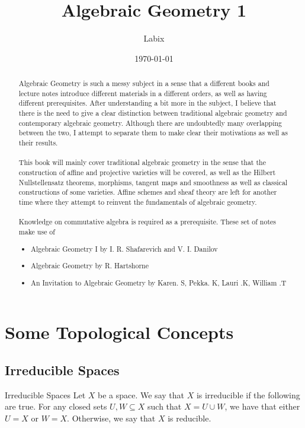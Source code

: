\documentclass[a4paper]{article}
\title{Algebraic Geometry 1}
\author{Labix}
\date{\today}
\begin{document}
\maketitle
\begin{abstract}
Algebraic Geometry is such a messy subject in a sense that a different books and lecture notes introduce different materials in a different orders, as well as having different prerequisites. After understanding a bit more in the subject, I believe that there is the need to give a clear distinction between traditional algebraic geometry and contemporary algebraic geometry. Although there are undoubtedly many overlapping between the two, I attempt to separate them to make clear their motivations as well as their results. \\~\\

This book will mainly cover traditional algebraic geometry in the sense that the construction of affine and projective varieties will be covered, as well as the Hilbert Nullstellensatz theorems, morphisms, tangent maps and smoothness as well as classical constructions of some varieties. Affine schemes and sheaf theory are left for another time where they attempt to reinvent the fundamentals of algebraic geometry. \\~\\

Knowledge on commutative algebra is required as a prerequisite. These set of notes make use of
\begin{itemize}
\item Algebraic Geometry I by I. R. Shafarevich and V. I. Danilov
\item Algebraic Geometry by R. Hartshorne
\item An Invitation to Algebraic Geometry by Karen. S, Pekka. K, Lauri .K, William .T
\end{itemize}
\end{abstract}
\pagebreak
\tableofcontents

\pagebreak
\section{Some Topological Concepts}
\subsection{Irreducible Spaces}
\begin{defn}{Irreducible Spaces}{} Let $X$ be a space. We say that $X$ is irreducible if the following are true. For any closed sets $U,W\subseteq X$ such that $X=U\cup W$, we have that either $U=X$ or $W=X$. Otherwise, we say that $X$ is reducible. 
\end{defn}
\end{document}
